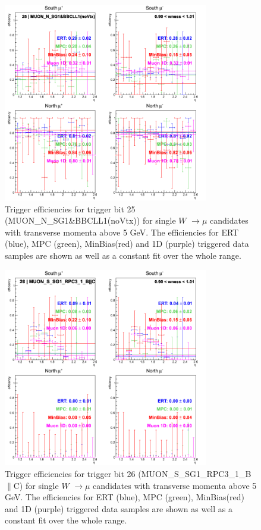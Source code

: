\begin{figure}[ht]
\begin{center}
\includegraphics[width=0.8\textwidth]{./figures/run13_trigeffieta_w1_trig25_lin.png}
\caption{\label{fig:run13_trigeffieta_w0_nper0_trig25_lin} Trigger efficiencies for trigger bit 25 (MUON\_N\_SG1\&BBCLL1(noVtx)) for single $W$ $\rightarrow \mu$ candidates with transverse momenta above 5 GeV. The efficiencies for ERT (blue), MPC (green), MinBias(red) and 1D (purple) triggered data samples are shown as well as a constant fit over the whole range.}
\end{center}
\end{figure}
\begin{figure}[ht]
\begin{center}
\includegraphics[width=0.8\textwidth]{./figures/run13_trigeffieta_w1_trig26_lin.png}
\caption{\label{fig:run13_trigeffieta_w0_nper0_trig26_lin} Trigger efficiencies for trigger bit 26 (MUON\_S\_SG1\_RPC3\_1\_B$\|$C) for single $W$ $\rightarrow \mu$ candidates with transverse momenta above 5 GeV. The efficiencies for ERT (blue), MPC (green), MinBias(red) and 1D (purple) triggered data samples are shown as well as a constant fit over the whole range.}
\end{center}
\end{figure}
